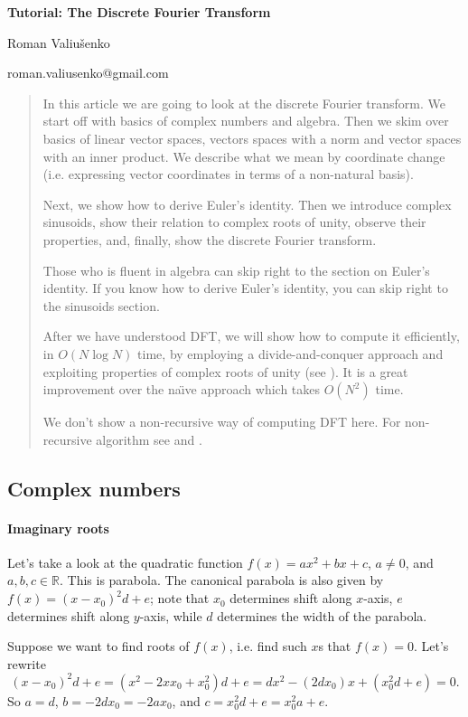 \documentclass[10pt]{article}
\begin{document}
\pagestyle{myheadings}

\centerline{\bf Tutorial: The Discrete Fourier Transform}
\centerline{Roman Valiu\v{s}enko}
\centerline{roman.valiusenko@gmail.com}

\begin{abstract}
In this article we are going to look at the discrete Fourier transform. We
start off with basics of complex numbers and algebra. Then we skim over basics
of linear vector spaces, vectors spaces with a norm and vector spaces with an
inner product. We describe what we mean by coordinate change (i.e.  expressing
vector coordinates in terms of a non-natural basis).

Next, we show how to derive Euler's identity. Then we introduce complex
sinusoids, show their relation to complex roots of unity, observe their
properties, and, finally, show the discrete Fourier transform.

Those who is fluent in algebra can skip right to the section on Euler's
identity. If you know how to derive Euler's identity, you can skip right to the
sinusoids section.

After we have understood DFT, we will show how to compute it efficiently, in
$O(N\log N)$ time, by employing a divide-and-conquer approach and exploiting
properties of complex roots of unity (see \cite{Cooley1965}). It is a great
improvement over the na\"\i ve approach which takes $O(N^2)$ time.

We don't show a non-recursive way of computing DFT here. For non-recursive
algorithm see \cite{Cormen2009} and \cite{Papadim2006}.  \end{abstract}

\subsection*{Complex numbers}

\paragraph {Imaginary roots} Let's take a look at the quadratic function
$f(x)=ax^2+bx+c$, $a\ne 0$, and $a, b, c \in \mathbb{R}$. This is parabola. The
canonical parabola is also given by $f(x)=(x-x_0)^2d+e$; note that $x_0$
determines shift along $x$-axis, $e$ determines shift along $y$-axis, while $d$
determines the width of the parabola. 

Suppose we want to find roots of $f(x)$, i.e. find such $x$s that $f(x)=0$.
Let's rewrite $$(x-x_0)^2d+e=(x^2-2xx_0+x_0^2)d+e=dx^2-(2dx_0)x+(x_0^2d+e)=0.$$
So $a=d$, $b=-2dx_0=-2ax_0$, and $c=x_0^2d+e=x_0^2a+e$.
\end{document}
